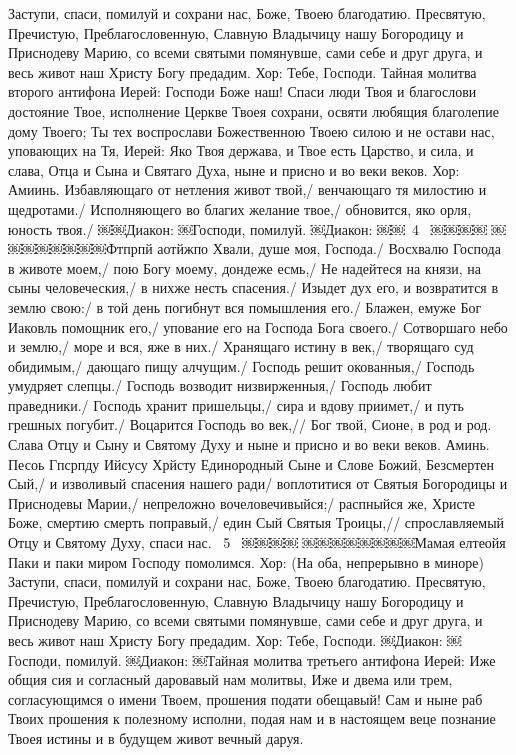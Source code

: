 Заступи, спаси, помилуй и сохрани нас, Боже, Твоею благодатию.
Пресвятую, Пречистую, Преблагословенную, Славную Владычицу нашу Богородицу и Приснодеву Марию, со всеми святыми помянувше, сами себе и друг друга, и весь живот наш Христу Богу предадим.
Хор: Тебе, Господи.
Тайная молитва второго антифона
Иерей: Господи Боже наш! Спаси люди Твоя и благослови достояние Твое, исполнение Церкве Твоея сохрани, освяти любящия благолепие дому Твоего; Ты тех воспрослави Божественною Твоею силою и не остави нас, уповающих на Тя,
Иерей: Яко Твоя держава, и Твое есть Царство, и сила, и слава, Отца и Сына и Святаго Духа, ныне и присно и во веки веков.
Хор: Амиинь.
Избавляющаго от нетления живот твой,/ венчающаго тя милостию и щедротами./
Исполняющего во благих желание твое,/ обновится, яко орля, юность твоя./
￼￼Диакон:
￼Господи, помилуй.
￼Диакон:
￼￼~4~
￼￼￼￼
￼￼￼￼￼￼￼￼Фтпрпй аотйжпо
Хвали, душе моя, Господа./ Восхвалю Господа в животе моем,/ пою Богу моему, дондеже есмь,/
Не надейтеся на князи, на сыны человеческия,/ в нихже несть спасения./
Изыдет дух его, и возвратится в землю свою:/ в той день погибнут вся помышления его./
Блажен, емуже Бог Иаковль помощник его,/ упование его на Господа Бога своего./
Сотворшаго небо и землю,/ море и вся, яже в них./
Хранящаго истину в век,/ творящаго суд обидимым,/ дающаго пищу алчущим./
Господь решит окованныя,/ Господь умудряет слепцы./ Господь возводит низвирженныя,/ Господь любит праведники./ Господь хранит пришельцы,/ сира и вдову приимет,/ и путь грешных погубит./
Воцарится Господь во век,// Бог твой, Сионе, в род и род.
Слава Отцу и Сыну и Святому Духу и ныне и присно и во веки веков. Аминь.
Песоь Гпсрпду Ийсусу Хрйсту
Единородный Сыне и Слове Божий, Безсмертен Сый,/ и изволивый спасения нашего ради/ воплотитися от Святыя Богородицы и Приснодевы Марии,/ непреложно вочеловечивыйся;/ распныйся же, Христе Боже, смертию смерть поправый,/ един Сый Святыя Троицы,// спрославляемый Отцу и Святому Духу, спаси нас.
~5~
￼￼￼￼
￼￼￼￼￼￼￼￼Мамая елтеойя
Паки и паки миром Господу помолимся.
Хор: (На оба, непрерывно в миноре)
Заступи, спаси, помилуй и сохрани нас, Боже, Твоею благодатию.
Пресвятую, Пречистую, Преблагословенную, Славную Владычицу нашу Богородицу и Приснодеву Марию, со всеми святыми помянувше, сами себе и друг друга, и весь живот наш Христу Богу предадим.
Хор: Тебе, Господи.
￼Диакон:
￼Господи, помилуй.
￼Диакон:
￼Тайная молитва третьего антифона
Иерей: Иже общия сия и согласный даровавый нам молитвы, Иже и двема или трем, согласующимся о имени Твоем, прошения подати обещавый! Сам и ныне раб Твоих прошения к полезному исполни, подая нам и в настоящем веце познание Твоея истины и в будущем живот вечный даруя.

